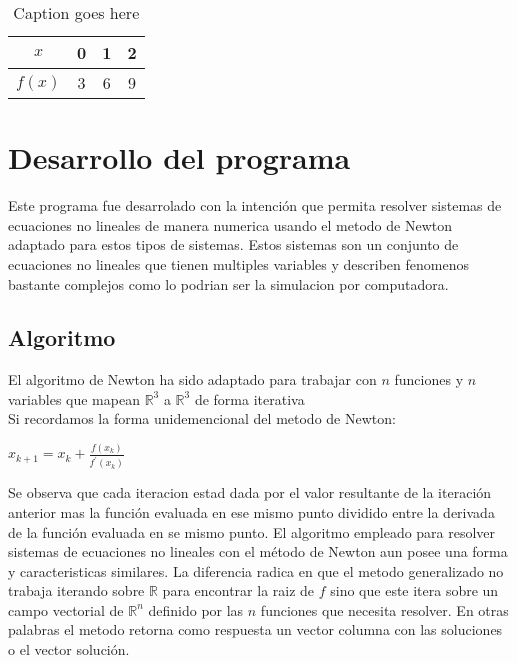 \documentclass[11pt]{article}
\begin{document}
\begin{table}[H]
	\centering
		\begin{tabular}{|c|c|c|c|}\hline
		$x$ &0&1&2\\ \hline
		$f(x)$ &3&6&9\\ \hline		
		\end{tabular}
	\caption{Caption goes here}
	\label{tab:data1}
\end{table}


\section{Desarrollo del programa}
Este programa fue desarrolado con la intención que permita resolver sistemas de ecuaciones no lineales de manera numerica usando el metodo de Newton adaptado para estos tipos de sistemas. Estos sistemas son un conjunto de ecuaciones no lineales que tienen multiples variables y describen fenomenos bastante complejos como lo podrian ser la simulacion por computadora. 

\subsection{Algoritmo}
El algoritmo de Newton ha sido adaptado para trabajar con $n$ funciones y $n$ variables que mapean $\mathbb{R}^3$ a $\mathbb{R}^3$ de forma iterativa\\

Si recordamos la forma unidemencional del metodo de Newton:\\
\begin{center}
$x_{k+1} = x_{k} + \frac{f(x_{k})}{f^\prime(x_{k})} \label{eq:1}$\\
\end{center}

Se observa que cada iteracion estad dada por el valor resultante de la iteración anterior mas la función evaluada en ese mismo punto dividido entre la derivada de la función evaluada en se mismo punto. El algoritmo empleado para resolver sistemas de ecuaciones no lineales con el método de Newton aun posee una forma y caracteristicas similares. La diferencia radica en que el metodo generalizado no trabaja iterando sobre $\mathbb{R}$ para encontrar la raiz de $f$ sino que este itera sobre un campo vectorial de $\mathbb{R}^n$ definido por las $n$ funciones que necesita resolver. En otras palabras el metodo retorna como respuesta un vector columna con las soluciones o el vector solución.\\
\end{document}
